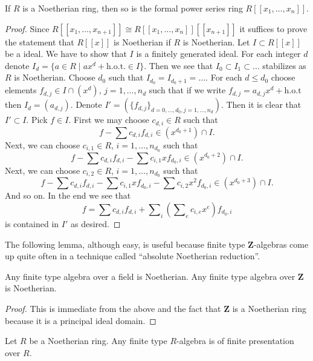\begin{lemma}
\label{lemma-Noetherian-power-series}
If $R$ is a Noetherian ring, then so is the formal power
series ring $R[[x_1, \ldots, x_n]]$.
\end{lemma}

\begin{proof}
Since $R[[x_1, \ldots, x_{n + 1}]] \cong R[[x_1, \ldots, x_n]][[x_{n + 1}]]$
it suffices to prove the statement that $R[[x]]$ is Noetherian if
$R$ is Noetherian. Let $I \subset R[[x]]$ be a ideal.
We have to show that $I$ is a finitely generated ideal.
For each integer
$d$ denote $I_d = \{a \in R \mid ax^d + \text{h.o.t.} \in I\}$.
Then we see that $I_0 \subset I_1 \subset \ldots$ stabilizes as $R$
is Noetherian. Choose $d_0$ such that $I_{d_0} = I_{d_0 + 1} = \ldots$.
For each $d \leq d_0$ choose elements $f_{d, j} \in I \cap (x^d)$,
$j = 1, \ldots, n_d$ such that if we write
$f_{d, j} = a_{d, j}x^d + \text{h.o.t}$ then $I_d = (a_{d, j})$.
Denote $I' = (\{f_{d, j}\}_{d = 0, \ldots, d_0, j = 1, \ldots, n_d})$.
Then it is clear that $I' \subset I$. Pick $f \in I$.
First we may choose $c_{d, i} \in R$ such that
$$
f - \sum c_{d, i} f_{d, i} \in (x^{d_0 + 1}) \cap I.
$$
Next, we can choose $c_{i, 1} \in R$, $i = 1, \ldots, n_{d_0}$ such that
$$
f - \sum c_{d, i} f_{d, i} - \sum c_{i, 1}xf_{d_0, i} \in (x^{d_0 + 2}) \cap I.
$$
Next, we can choose $c_{i, 2} \in R$, $i = 1, \ldots, n_{d_0}$ such that
$$
f - \sum c_{d, i} f_{d, i} - \sum c_{i, 1}xf_{d_0, i}
- \sum c_{i, 2}x^2f_{d_0, i}
\in (x^{d_0 + 3}) \cap I.
$$
And so on. In the end we see that
$$
f = \sum c_{d, i} f_{d, i} +
\sum\nolimits_i (\sum\nolimits_e c_{i, e} x^e)f_{d_0, i}
$$
is contained in $I'$ as desired.
\end{proof}

\noindent
The following lemma, although easy, is useful because
finite type $\mathbf{Z}$-algebras come up quite often in
a technique called ``absolute Noetherian reduction''.

\begin{lemma}
\label{lemma-obvious-Noetherian}
Any finite type algebra over a field is Noetherian.
Any finite type algebra over $\mathbf{Z}$ is Noetherian.
\end{lemma}

\begin{proof}
This is immediate from the above and the fact that
$\mathbf{Z}$ is a Noetherian ring because it is a
principal ideal domain.
\end{proof}

\begin{lemma}
\label{lemma-Noetherian-finite-type-is-finite-presentation}
Let $R$ be a Noetherian ring.
Any finite type $R$-algebra is of finite presentation over $R$.
\end{lemma}

